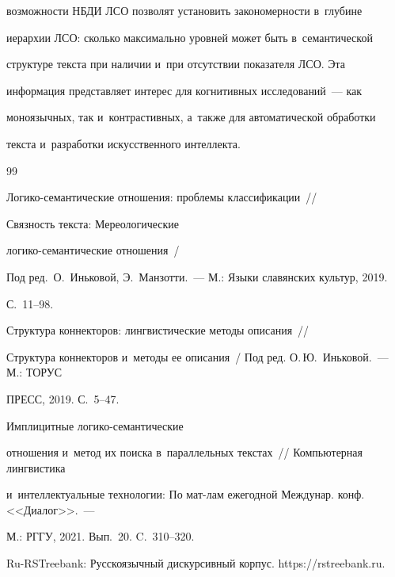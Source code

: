 возможности НБДИ ЛСО позволят установить закономерности в~глубине 


иерархии ЛСО: сколько максимально уровней может быть в~семантической 


структуре текс\-та при наличии и~при отсутствии показателя ЛСО. Эта 


информация пред\-став\-ля\-ет интерес для когнитивных исследований~--- как 


моноязычных, так и~контрастивных, а~также для автоматической обработки 


текс\-та и~разработки искусственного интеллекта. 


  


{\small\frenchspacing


{%




\begin{thebibliography}{99}




 Логико-семантические отношения: проб\-ле\-мы классификации~/\!\!/ 


 Связность текста: Мереологические  


ло\-ги\-ко-се\-ман\-ти\-че\-ские отношения~/


Под ред.\ О.~Иньковой, Э.~Манзотти.~--- М.: Языки славянских культур, 2019. 


 С.~11--98.




 Структура коннекторов: лингвистические методы описания~/\!\!/ 


Структура коннекторов и~методы ее описания~/ Под ред. О.\,Ю.~Иньковой.~--- М.: ТОРУС 


ПРЕСС, 2019. С.~5--47. 




 Имплицитные ло\-ги\-ко-се\-ман\-ти\-че\-ские 


отношения и~метод их поиска в~параллельных текстах~/\!\!/ Компьютерная лингвистика 


и~интеллектуальные технологии: По мат-лам ежегодной Междунар. конф. <<Диалог>>.~---  


М.: РГГУ, 2021. Вып.~20. C.~310--320.




Ru-RSTreebank: Русскоязычный дискурсивный корпус. {\sf https://rstreebank.ru}.



\end{thebibliography}}}
